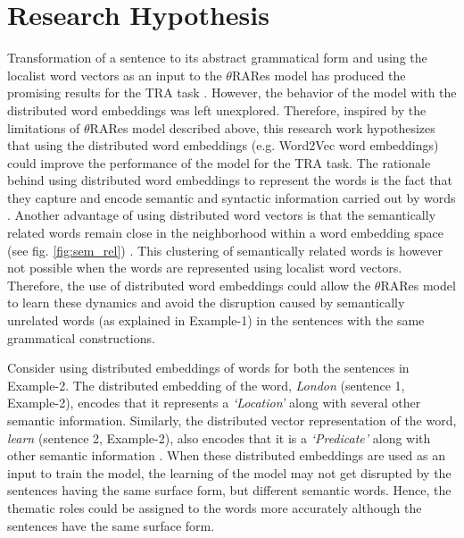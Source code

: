\section{Research Hypothesis}

Transformation of a sentence to its abstract grammatical form and using the localist word vectors as an input to the $\theta$RARes model has produced the promising results for the TRA task \cite{xavier:2013:RT, tra:xavier_wermter:2014, tra:xavier_hri}. However, the behavior of the model with the distributed word embeddings was left unexplored. Therefore, inspired by the limitations of $\theta$RARes model described above, this research work hypothesizes that using the distributed word embeddings (e.g. Word2Vec word embeddings) could improve the performance of the model for the TRA task. The rationale behind using distributed word embeddings to represent the words is the fact that they capture and encode semantic and syntactic information carried out by words \cite{w2v:mikolov_2013_distributed, w2v:regularities_in_word_representations}. Another advantage of using distributed word vectors is that the semantically related words remain close in the neighborhood within a word embedding space (see fig. \ref{fig:sem_rel}) \cite{w2v:mikolov_2013_distributed}. This clustering of semantically related words is however not possible when the words are represented using localist word vectors. Therefore, the use of distributed word embeddings could allow the $\theta$RARes model to learn these dynamics and avoid the disruption caused by semantically unrelated words (as explained in Example-1) in the sentences with the same grammatical constructions.

Consider using distributed embeddings of words for both the sentences in Example-2. The distributed embedding of the word, \textit{London} (sentence 1, Example-2), encodes that it represents a \textit{`Location'} along with several other semantic information. Similarly, the distributed vector representation of the word, \textit{learn} (sentence 2, Example-2), also encodes that it is a \textit{`Predicate'} along with other semantic information \cite{w2v:mikolov_2013_efficient}. When these distributed embeddings are used as an input to train the model, the learning of the model may not get disrupted by the sentences having the same surface form, but different semantic words. Hence, the thematic roles could be assigned to the words more accurately although the sentences have the same surface form.